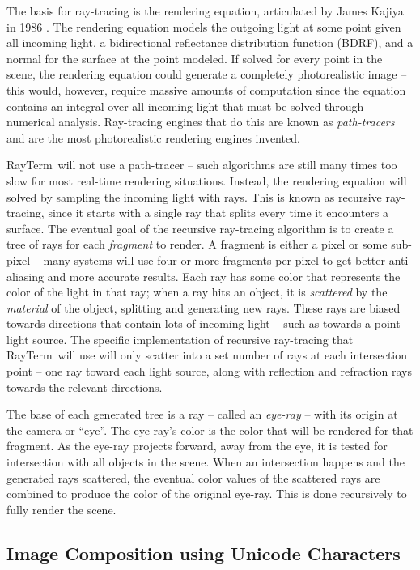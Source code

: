 \documentclass[11pt]{article}
\newcommand{\name}{{\sc RayTerm}}
\begin{document}
The basis for ray-tracing is the rendering equation, articulated by James Kajiya in 1986 \cite{kajiya1986rendering}.
The rendering equation models the outgoing light at some point given all incoming light, a bidirectional reflectance distribution function (BDRF), and a normal for the surface at the point modeled.
If solved for every point in the scene, the rendering equation could generate a completely photorealistic image -- this would, however, require massive amounts of computation since the equation contains an integral over all incoming light that must be solved through numerical analysis.
Ray-tracing engines that do this are known as {\it path-tracers} and are the most photorealistic rendering engines invented.

\name\ will not use a path-tracer -- such algorithms are still many times too slow for most real-time rendering situations.
Instead, the rendering equation will solved by sampling the incoming light with rays.
This is known as recursive ray-tracing, since it starts with a single ray that splits every time it encounters a surface.
The eventual goal of the recursive ray-tracing algorithm is to create a tree of rays for each {\it fragment} to render.
A fragment is either a pixel or some sub-pixel -- many systems will use four or more fragments per pixel to get better anti-aliasing and more accurate results.
Each ray has some color that represents the color of the light in that ray; when a ray hits an object, it is {\it scattered} by the {\it material} of the object, splitting and generating new rays.
These rays are biased towards directions that contain lots of incoming light -- such as towards a point light source.
The specific implementation of recursive ray-tracing that \name\ will use will only scatter into a set number of rays at each intersection point -- one ray toward each light source, along with reflection and refraction rays towards the relevant directions.

The base of each generated tree is a ray -- called an {\it eye-ray} -- with its origin at the camera or ``eye''.
The eye-ray's color is the color that will be rendered for that fragment.
As the eye-ray projects forward, away from the eye, it is tested for intersection with all objects in the scene.
When an intersection happens and the generated rays scattered, the eventual color values of the scattered rays are combined to produce the color of the original eye-ray.
This is done recursively to fully render the scene.


\subsection{Image Composition using Unicode Characters}
\label{sec:introduction:unicode}
\end{document}
